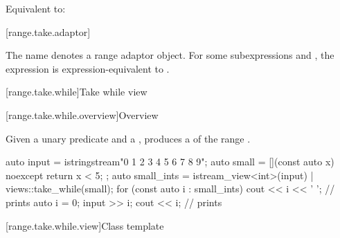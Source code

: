 \begin{itemdescr}
\pnum
\effects
Equivalent to:
\end{itemdescr}

[range.take.adaptor]{}

\pnum
The name  denotes a
range adaptor object.
For some subexpressions  and , the expression
 is expression-equivalent to
.

[range.take.while]{Take while view}

[range.take.while.overview]{Overview}

\pnum
Given a unary predicate  and a  ,
 produces a 
of the range .

\pnum
\begin{example}
\begin{codeblock}
auto input = istringstream{"0 1 2 3 4 5 6 7 8 9"};
auto small = [](const auto x) noexcept { return x < 5; };
auto small_ints = istream_view<int>(input) | views::take_while(small);
for (const auto i : small_ints) {
  cout << i << ' ';                             // prints 
}
auto i = 0;
input >> i;
cout << i;                                      // prints 
\end{codeblock}
\end{example}

[range.take.while.view]{Class template }

